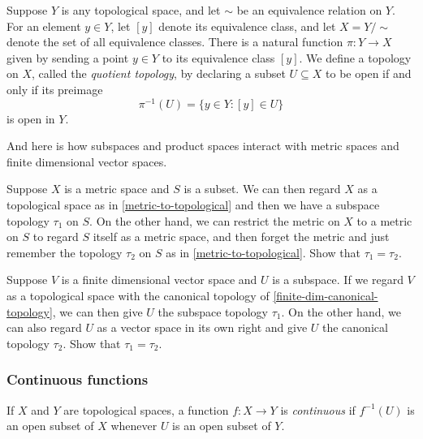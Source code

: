 \begin{example} \label{quotient-space} 
	Suppose $Y$ is any topological space, and let $\sim$ be an equivalence relation on $Y$. For an element $y \in Y$, let $[y]$ denote its equivalence class, and let $X = Y/\sim$ denote the set of all equivalence classes. There is a natural function $\pi : Y \to X$ given by sending a point $y \in Y$ to its equivalence class $[y]$. We define a topology on $X$, called the \emph{quotient topology}, by declaring a subset $U \subseteq X$ to be open if and only if its preimage \[ \pi^{-1}(U) = \{ y \in Y : [y] \in U \} \] is open in $Y$. 
\end{example}

And here is how subspaces and product spaces interact with metric spaces and finite dimensional vector spaces. 

\begin{exercise} \label{metric-subspace}
	Suppose $X$ is a metric space and $S$ is a subset. We can then regard $X$ as a topological space as in \cref{metric-to-topological} and then we have a subspace topology $\tau_1$ on $S$. On the other hand, we can restrict the metric on $X$ to a metric on $S$ to regard $S$ itself as a metric space, and then forget the metric and just remember the topology $\tau_2$ on $S$ as in \cref{metric-to-topological}. Show that $\tau_1 = \tau_2$. 
\end{exercise}

\begin{exercise}
	Suppose $V$ is a finite dimensional vector space and $U$ is a subspace. If we regard $V$ as a topological space with the canonical topology of \cref{finite-dim-canonical-topology}, we can then give $U$ the subspace topology $\tau_1$. On the other hand, we can also regard $U$ as a vector space in its own right and give $U$ the canonical topology $\tau_2$. Show that $\tau_1 = \tau_2$.  
\end{exercise}

\subsubsection*{Continuous functions}

\begin{definition} \label{continuous-definition} 
	If $X$ and $Y$ are topological spaces, a function $f : X \to Y$ is \emph{continuous} if $f^{-1}(U)$ is an open subset of $X$ whenever $U$ is an open subset of $Y$. 
\end{definition}

